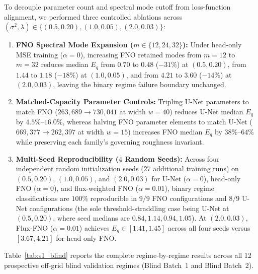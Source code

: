 \documentclass[preprint,12pt,authoryear]{elsarticle}
\begin{document}
To decouple parameter count and spectral mode cutoff from loss-function alignment, we performed three controlled ablations across $(\sigma^2, \lambda) \in \{(0.5, 0.20), (1.0, 0.05), (2.0, 0.03)\}$:
\begin{enumerate}
  \item \textbf{FNO Spectral Mode Expansion ($m \in \{12, 24, 32\}$):} Under head-only MSE training ($\alpha = 0$), increasing FNO retained modes from $m = 12$ to $m = 32$ reduces median $E_q$ from $0.70$ to $0.48$ ($-31\%$) at $(0.5, 0.20)$, from $1.44$ to $1.18$ ($-18\%$) at $(1.0, 0.05)$, and from $4.21$ to $3.60$ ($-14\%$) at $(2.0, 0.03)$, leaving the binary regime failure boundary unchanged.
  \item \textbf{Matched-Capacity Parameter Controls:} Tripling U-Net parameters to match FNO ($263{,}689 \to 730{,}041$ at width $w = 40$) reduces U-Net median $E_q$ by $4.5\%$--$16.0\%$, whereas halving FNO parameter elements to match U-Net ($669{,}377 \to 262{,}397$ at width $w = 15$) increases FNO median $E_q$ by $38\%$--$64\%$ while preserving each family's governing roughness invariant.
  \item \textbf{Multi-Seed Reproducibility ($4$ Random Seeds):} Across four independent random initialization seeds ($27$ additional training runs) on $(0.5, 0.20)$, $(1.0, 0.05)$, and $(2.0, 0.03)$ for U-Net ($\alpha = 0$), head-only FNO ($\alpha = 0$), and flux-weighted FNO ($\alpha = 0.01$), binary regime classifications are $100\%$ reproducible in $9/9$ FNO configurations and $8/9$ U-Net configurations (the sole threshold-straddling case being U-Net at $(0.5, 0.20)$, where seed medians are $0.84, 1.14, 0.94, 1.05$). At $(2.0, 0.03)$, Flux-FNO ($\alpha = 0.01$) achieves $E_q \in [1.41, 1.45]$ across all four seeds versus $[3.67, 4.21]$ for head-only FNO.
\end{enumerate}

Table~\ref{tab:s1_blind} reports the complete regime-by-regime results across all 12 prospective off-grid blind validation regimes (Blind Batch~1 and Blind Batch~2).
\end{document}
